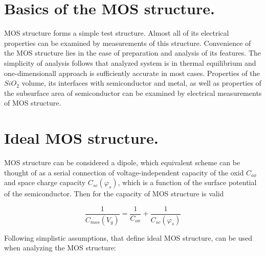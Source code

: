 \section{Basics of the MOS structure.}
MOS structure forms a simple test structure. Almost all of its
electrical properties can be examined by measurements of this
structure. Convenience of the MOS structure lies in the ease of
preparation and analysis of its features. The simplicity of analysis
follows that analyzed system is in thermal equilibrium and
one-dimensionall approach is sufficiently accurate in most
cases. Properties of the $SiO_2$ volume, its interfaces with
semiconductor and metal, as well as properties of the subsurface
area of semiconductor can be examined by electrical measurements of
MOS structure.

\iffalse
\section{Ideálna štruktúra MOS.}  \index{MOS!ideálna štruktúra}
Štruktúru MOS možno považovať za dvojpól, ktorého náhradnú schému si
možno predstaviť ako sériové zapojenie napäťovonezávislej kapacity
oxidu $C_{ox}$ a kapacity oblasti priestorového náboja (OPN)
$C_{sc}(\varphi_{s})$, ktorá je funkciou povrchového potenciálu
polovodiča. Potom pre kapacitu štruktúry MOS platí \cite{I.1}
\fi


\section{Ideal MOS structure.}
MOS structure can be considered a dipole, which equivalent scheme can
be thought of as a serial connection of voltage-independent capacity
of the oxid $C_{ox}$ and space charge capacity $C_{sc}(\varphi_{s})$,
which is a function of the surface potential of the
semiconductor. Then for the capacity of MOS structure is valid
\cite{I.1}

\begin{equation}\label{eq:1.1}
\frac{1}{C_{mos}(V_g)} = \frac{1}{C_{ox}} + \frac{1}{C_{sc}(\varphi_s)}
\end{equation}

\iffalse
Pri analýze štruktúry MOS sa používajú následovné zjednodušujúce
predpoklady, ktoré definujú ideálnu štruktúru MOS:
\fi

Following simplistic assumptions, that define ideal MOS structure, can
be used when analyzing the MOS structure:

\iffalse
\begin{itemize}
\item hustota pascí rozhrania $Si-SiO_2$ je rovná nule 
\item v izolátore, ktorý tvorí $SiO_2$, sa nenachádzajú náboje 
\item rozdiel výstupných potenciálov z kovu a polovodiča je rovný nule
\item platí vzťah $V_{g}=V_{ox}+\varphi_{s}$  .
\end{itemize}
\fi


